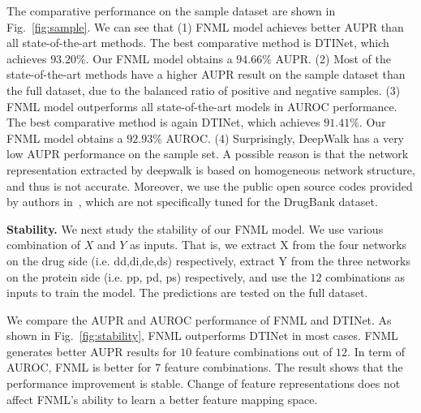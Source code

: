 \documentclass[sigconf,anonymous]{acmart}
\begin{document}
The comparative performance on the sample dataset are shown in Fig.~\ref{fig:sample}. We can see that (1) FNML model achieves better AUPR than all state-of-the-art methods. The best comparative method is DTINet, which achieves $93.20\%$. Our FNML model obtains a $94.66\%$ AUPR. (2) Most of the state-of-the-art methods have a higher AUPR result on the sample dataset than the full dataset, due to the balanced ratio of positive and negative samples. (3) FNML model outperforms all state-of-the-art models in AUROC performance.  The best comparative method is again DTINet, which achieves $91.41\%$. Our FNML model obtains a $92.93\%$ AUROC. (4) Surprisingly, DeepWalk has a very low AUPR performance on the sample set. A possible reason is that the network representation extracted by deepwalk is based on homogeneous network structure, and thus is not accurate. Moreover, we use the public open source codes provided by authors in~\cite{Zong2017Deep}, which are not specifically tuned for the DrugBank dataset.

\textbf{Stability.} We next study the stability of our FNML model. We use various combination of $X$ and $Y$ as inputs. That is, we extract X from the four networks on the drug side (i.e. dd,di,de,ds) respectively, extract Y from the three networks on the protein side (i.e. pp, pd, ps) respectively, and use the $12$ combinations as inputs to train the model. The predictions are tested on the full dataset.

We compare the AUPR and AUROC performance of FNML and DTINet. As shown in Fig.~\ref{fig:stability}, FNML outperforms DTINet in most cases. FNML generates better AUPR results for $10$ feature combinations out of $12$. In term of AUROC, FNML is better for $7$ feature combinations. The result shows that the performance improvement is stable. Change of feature representations does not affect FNML's ability to learn a better feature mapping space.
\end{document}
